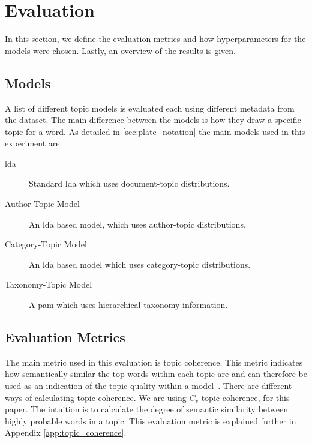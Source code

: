 \section{Evaluation}\label{sec:experiment}
In this section, we define the evaluation metrics and how hyperparameters for the models were chosen.
Lastly, an overview of the results is given.

\subsection{Models}\label{sec:experiment_models}
A list of different topic models is evaluated each using different metadata from the dataset.
The main difference between the models is how they draw a specific topic for a word.
As detailed in \autoref{sec:plate_notation} the main models used in this experiment are:
\begin{description}
	\item[\Acrlong{lda}] Standard \gls{lda} which uses document-topic distributions.
	\item[Author-Topic Model]\cite{author_topic_2012} An \gls{lda} based model, which uses author-topic distributions.
	\item[Category-Topic Model] An \gls{lda} based model which uses category-topic distributions.
	\item[Taxonomy-Topic Model] A \acrlong{pam} which uses hierarchical taxonomy information.
\end{description}

\subsection{Evaluation Metrics}\label{sec:experiment_metrics}
The main metric used in this evaluation is topic coherence\cite{Syed2017coherence}.
This metric indicates how semantically similar the top words within each topic are and can therefore be used as an indication of the topic quality within a model~\cite{topic_coherence_2015}.
There are different ways of calculating topic coherence.
We are using $C_v$ topic coherence, for this paper.
The intuition is to calculate the degree of semantic similarity between highly probable words in a topic.
This evaluation metric is explained further in Appendix \autoref{app:topic_coherence}.

